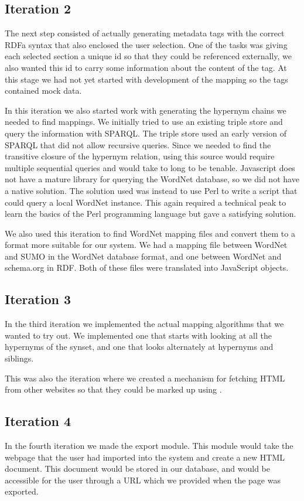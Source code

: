 \subsection{Iteration 2}
The next step consisted of actually generating metadata tags with the correct RDFa syntax that also enclosed the user selection.
One of the tasks was giving each selected section a unique id so that they could be referenced externally,
we also wanted this id to carry some information about the content of the tag.
At this stage we had not yet started with development of the mapping so the tags contained mock data.

In this iteration we also started work with generating the hypernym chains we needed to find mappings.
We initially tried to use an existing triple store and query the information with SPARQL.
The triple store used an early version of SPARQL that did not allow recursive queries.
Since we needed to find the transitive closure of the hypernym relation,
using this source would require multiple sequential queries and would take to long to be tenable.
Javascript does not have a mature library for querying the WordNet database, so we did not have a native solution.
The solution used was instead to use Perl to write a script that could query a local WordNet instance.
This again required a technical peak to learn the basics of the Perl programming language but gave a satisfying solution.

We also used this iteration to find WordNet mapping files and convert them to a format more suitable for our system.
We had a mapping file between WordNet and SUMO in the WordNet database format,
and one between WordNet and schema.org in RDF.
Both of these files were translated into JavaScript objects.

\subsection{Iteration 3}
In the third iteration we implemented the actual mapping algorithms that we wanted to try out.
We implemented one that starts with looking at all the hypernyms of the synset,
and one that looks alternately at hypernyms and siblings.

This was also the iteration where we created a mechanism for fetching HTML from other websites so that they could be
marked up using \theartefact.

\subsection{Iteration 4}
In the fourth iteration we made the export module.
This module would take the webpage that the user had imported into the system and create a new HTML document.
This document would be stored in our database, and would be accessible for the user through a URL which we provided when the page was exported.

